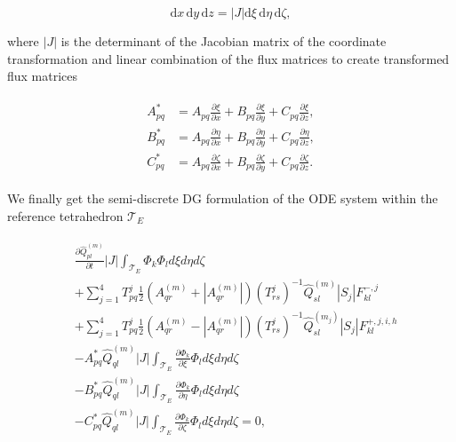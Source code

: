 \begin{equation}
    \text{d}x\, \text{d}y \, \text{d}z = \left|J\right| \text{d}\xi \,\text{d}\eta \,\text{d}\zeta,
\end{equation}

where $\left|J\right|$ is the determinant of the Jacobian matrix of the coordinate transformation and linear combination of the flux matrices to create transformed flux matrices

\begin{align}
    \begin{split}
        A_{pq}^{*} &= A_{pq} \frac{\partial \xi}{\partial x} + B_{pq} \frac{\partial \xi}{\partial y} + C_{pq} \frac{\partial \xi}{\partial z}, \\
        B_{pq}^{*} &= A_{pq} \frac{\partial \eta}{\partial x} + B_{pq} \frac{\partial \eta}{\partial y} + C_{pq} \frac{\partial \eta}{\partial z}, \\ 
        C_{pq}^{*} &= A_{pq} \frac{\partial \zeta}{\partial x} + B_{pq} \frac{\partial \zeta}{\partial y} + C_{pq} \frac{\partial \zeta}{\partial z}. 
    \end{split}
\end{align}

We finally get the semi-discrete \ac{DG} formulation of the ODE system within the reference tetrahedron $\mathcal{T}_E$

\begin{align}
    \begin{split}
        & \frac{\partial \hat{Q}_{pl}^{\left(m\right)}}{\partial t} \left|J\right| \int_{\mathcal{T}_E} \Phi_k \Phi_l d\xi d\eta d\zeta \\
        & + \sum_{j=1}^4 T_{pq}^j \frac{1}{2} \left(A_{qr}^{\left(m\right)} + \left| A_{qr}^{\left(m\right)}\right| \right) \left(T_{rs}^j\right)^{-1} \hat{Q}_{sl}^{\left(m\right)} \left|S_j\right| F_{kl}^{-,j} \\
        & + \sum_{j=1}^4 T_{pq}^j \frac{1}{2} \left(A_{qr}^{\left(m\right)} - \left| A_{qr}^{\left(m\right)}\right| \right) \left(T_{rs}^j\right)^{-1} \hat{Q}_{sl}^{\left(m_j\right)}\left|S_j\right| F_{kl}^{+,j,i,h} \\ 
        & - A_{pq}^* \hat{Q}_{ql}^{\left(m\right)} \left|J\right| \int_{\mathcal{T}_E} \frac{\partial \Phi_k}{\partial \xi} \Phi_l d\xi d\eta d\zeta \\
        & - B_{pq}^* \hat{Q}_{ql}^{\left(m\right)} \left|J\right| \int_{\mathcal{T}_E} \frac{\partial \Phi_k}{\partial \eta} \Phi_l d\xi d\eta d\zeta \\
        & - C_{pq}^* \hat{Q}_{ql}^{\left(m\right)} \left|J\right| \int_{\mathcal{T}_E} \frac{\partial \Phi_k}{\partial \zeta} \Phi_l d\xi d\eta d\zeta = 0,
    \end{split}
    \label{eq:finalform}
\end{align}


